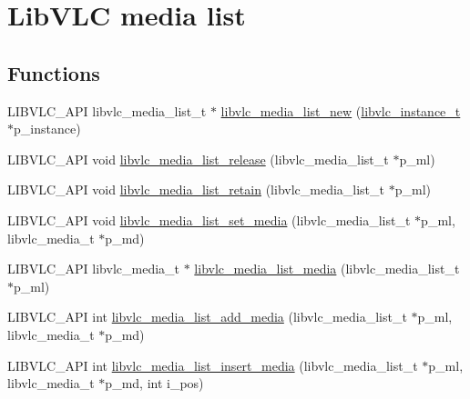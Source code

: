 \hypertarget{group__libvlc__media__list}{}\section{Lib\+V\+LC media list}
\label{group__libvlc__media__list}
\subsection*{Functions}
\begin{DoxyCompactItemize}
\item 
L\+I\+B\+V\+L\+C\+\_\+\+A\+PI libvlc\+\_\+media\+\_\+list\+\_\+t $\ast$ \hyperlink{group__libvlc__media__list_ga441500e86c4b21cb32afbc96a0733f57}{libvlc\+\_\+media\+\_\+list\+\_\+new} (\hyperlink{group__libvlc__core_ga316d739a80da4678206c79f4d6c2e284}{libvlc\+\_\+instance\+\_\+t} $\ast$p\+\_\+instance)
\item 
L\+I\+B\+V\+L\+C\+\_\+\+A\+PI void \hyperlink{group__libvlc__media__list_ga690973281c2f7f32cd366914a08c68dc}{libvlc\+\_\+media\+\_\+list\+\_\+release} (libvlc\+\_\+media\+\_\+list\+\_\+t $\ast$p\+\_\+ml)
\item 
L\+I\+B\+V\+L\+C\+\_\+\+A\+PI void \hyperlink{group__libvlc__media__list_ga2e6c93ff61c6380eb3c07d22ef47da8c}{libvlc\+\_\+media\+\_\+list\+\_\+retain} (libvlc\+\_\+media\+\_\+list\+\_\+t $\ast$p\+\_\+ml)
\item 
L\+I\+B\+V\+L\+C\+\_\+\+A\+PI void \hyperlink{group__libvlc__media__list_ga96a38e5aabb5781c2f1932d332363eef}{libvlc\+\_\+media\+\_\+list\+\_\+set\+\_\+media} (libvlc\+\_\+media\+\_\+list\+\_\+t $\ast$p\+\_\+ml, libvlc\+\_\+media\+\_\+t $\ast$p\+\_\+md)
\item 
L\+I\+B\+V\+L\+C\+\_\+\+A\+PI libvlc\+\_\+media\+\_\+t $\ast$ \hyperlink{group__libvlc__media__list_ga39f047f672f608104a599e827c2e7533}{libvlc\+\_\+media\+\_\+list\+\_\+media} (libvlc\+\_\+media\+\_\+list\+\_\+t $\ast$p\+\_\+ml)
\item 
L\+I\+B\+V\+L\+C\+\_\+\+A\+PI int \hyperlink{group__libvlc__media__list_gab1dea4f59a23ee3e151a34704f2b8bc5}{libvlc\+\_\+media\+\_\+list\+\_\+add\+\_\+media} (libvlc\+\_\+media\+\_\+list\+\_\+t $\ast$p\+\_\+ml, libvlc\+\_\+media\+\_\+t $\ast$p\+\_\+md)
\item 
L\+I\+B\+V\+L\+C\+\_\+\+A\+PI int \hyperlink{group__libvlc__media__list_ga96d55d4e9222ad4370774c4662b084e6}{libvlc\+\_\+media\+\_\+list\+\_\+insert\+\_\+media} (libvlc\+\_\+media\+\_\+list\+\_\+t $\ast$p\+\_\+ml, libvlc\+\_\+media\+\_\+t $\ast$p\+\_\+md, int i\+\_\+pos)

\end{DoxyCompactItemize}
